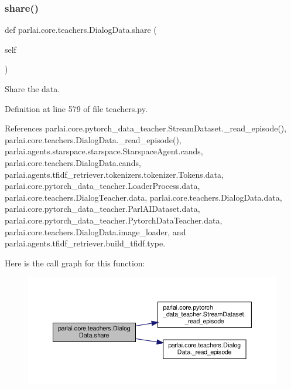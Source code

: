 \subsubsection{\texorpdfstring{share()}{share()}}
{\footnotesize\ttfamily def parlai.\+core.\+teachers.\+Dialog\+Data.\+share (\begin{DoxyParamCaption}\item[{}]{self }\end{DoxyParamCaption})}

\begin{DoxyVerb}Share the data.\end{DoxyVerb}
 

Definition at line 579 of file teachers.\+py.



References parlai.\+core.\+pytorch\+\_\+data\+\_\+teacher.\+Stream\+Dataset.\+\_\+read\+\_\+episode(), parlai.\+core.\+teachers.\+Dialog\+Data.\+\_\+read\+\_\+episode(), parlai.\+agents.\+starspace.\+starspace.\+Starspace\+Agent.\+cands, parlai.\+core.\+teachers.\+Dialog\+Data.\+cands, parlai.\+agents.\+tfidf\+\_\+retriever.\+tokenizers.\+tokenizer.\+Tokens.\+data, parlai.\+core.\+pytorch\+\_\+data\+\_\+teacher.\+Loader\+Process.\+data, parlai.\+core.\+teachers.\+Dialog\+Teacher.\+data, parlai.\+core.\+teachers.\+Dialog\+Data.\+data, parlai.\+core.\+pytorch\+\_\+data\+\_\+teacher.\+Parl\+A\+I\+Dataset.\+data, parlai.\+core.\+pytorch\+\_\+data\+\_\+teacher.\+Pytorch\+Data\+Teacher.\+data, parlai.\+core.\+teachers.\+Dialog\+Data.\+image\+\_\+loader, and parlai.\+agents.\+tfidf\+\_\+retriever.\+build\+\_\+tfidf.\+type.

Here is the call graph for this function\+:
\nopagebreak
\begin{figure}[H]
\begin{center}
\leavevmode
\includegraphics[width=350pt]{classparlai_1_1core_1_1teachers_1_1DialogData_ada6f4dc4e2a8a84fba5f1e54d214d15e_cgraph}
\end{center}
\end{figure}


